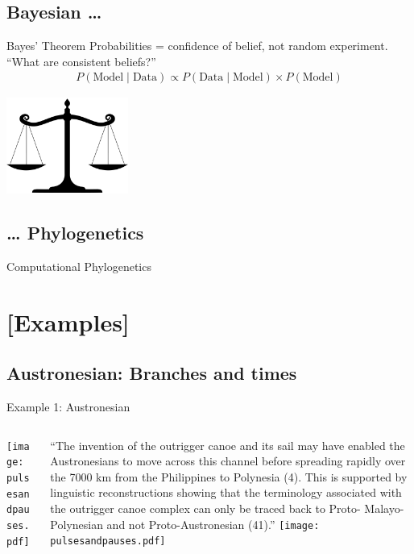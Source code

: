 \documentclass[9pt]{beamer}
\begin{document}
\subsection{Bayesian …}
\begin{frame}{Bayes' Theorem}
  Probabilities = confidence of belief, not random experiment.
  “What are consistent beliefs?”
  \begin{align}
    P(\text{Model} \mid \text{Data}) \propto P(\text{Data} \mid \text{Model}) \times P(\text{Model})
  \end{align}
  \begin{center}
    \includegraphics[width=0.3\textwidth]{scale.png}
  \end{center}
\end{frame}
\subsection{… Phylogenetics}
\begin{frame}{Computational Phylogenetics}
\end{frame}
\section{[Examples]}
\subsection{Austronesian: Branches and times}
\begin{frame}{Example 1: Austronesian}
  \begin{columns}
    \begin{column}{0.5\textwidth}
      \texttt{[image: pulsesandpauses.pdf]}
    \end{column}
    \begin{column}{0.5\textwidth}
      \footnotesize “The invention of the outrigger canoe and its
        sail may have enabled the Austronesians to move across this
        channel before spreading rapidly over the 7000 km from the
        Philippines to Polynesia (4). This is supported by linguistic
        reconstructions showing that the terminology associated with
        the outrigger canoe complex can only be traced back to Proto-
        Malayo-Polynesian and not Proto-Austronesian (41).”
      \texttt{[image: pulsesandpauses.pdf]}
    \end{column}
  \end{columns}
\end{frame}
\end{document}
